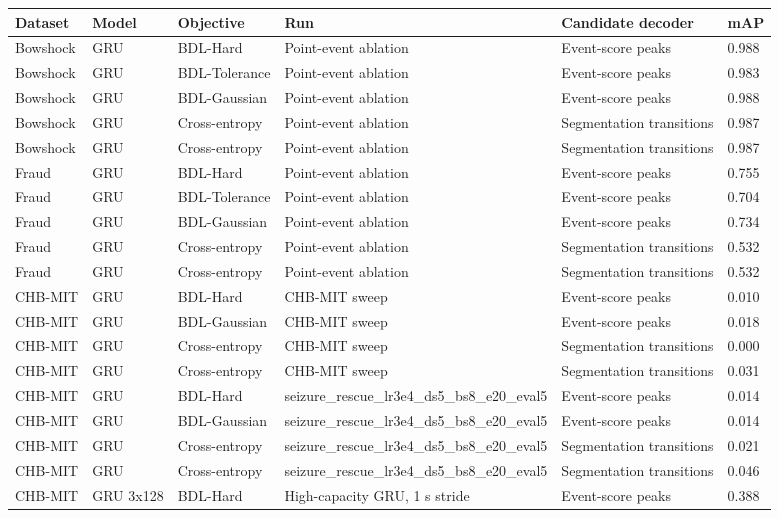 \begin{tabular}{llllll}
\toprule
Dataset & Model & Objective & Run & Candidate decoder & mAP \\
\midrule
Bowshock & GRU & BDL-Hard & Point-event ablation & Event-score peaks & 0.988 \\
Bowshock & GRU & BDL-Tolerance & Point-event ablation & Event-score peaks & 0.983 \\
Bowshock & GRU & BDL-Gaussian & Point-event ablation & Event-score peaks & 0.988 \\
Bowshock & GRU & Cross-entropy & Point-event ablation & Segmentation transitions & 0.987 \\
Bowshock & GRU & Cross-entropy & Point-event ablation & Segmentation transitions & 0.987 \\
Fraud & GRU & BDL-Hard & Point-event ablation & Event-score peaks & 0.755 \\
Fraud & GRU & BDL-Tolerance & Point-event ablation & Event-score peaks & 0.704 \\
Fraud & GRU & BDL-Gaussian & Point-event ablation & Event-score peaks & 0.734 \\
Fraud & GRU & Cross-entropy & Point-event ablation & Segmentation transitions & 0.532 \\
Fraud & GRU & Cross-entropy & Point-event ablation & Segmentation transitions & 0.532 \\
CHB-MIT & GRU & BDL-Hard & CHB-MIT sweep & Event-score peaks & 0.010 \\
CHB-MIT & GRU & BDL-Gaussian & CHB-MIT sweep & Event-score peaks & 0.018 \\
CHB-MIT & GRU & Cross-entropy & CHB-MIT sweep & Segmentation transitions & 0.000 \\
CHB-MIT & GRU & Cross-entropy & CHB-MIT sweep & Segmentation transitions & 0.031 \\
CHB-MIT & GRU & BDL-Hard & seizure\_rescue\_lr3e4\_ds5\_bs8\_e20\_eval5 & Event-score peaks & 0.014 \\
CHB-MIT & GRU & BDL-Gaussian & seizure\_rescue\_lr3e4\_ds5\_bs8\_e20\_eval5 & Event-score peaks & 0.014 \\
CHB-MIT & GRU & Cross-entropy & seizure\_rescue\_lr3e4\_ds5\_bs8\_e20\_eval5 & Segmentation transitions & 0.021 \\
CHB-MIT & GRU & Cross-entropy & seizure\_rescue\_lr3e4\_ds5\_bs8\_e20\_eval5 & Segmentation transitions & 0.046 \\
CHB-MIT & GRU 3x128 & BDL-Hard & High-capacity GRU, 1 s stride & Event-score peaks & 0.388 \\

\end{tabular}
